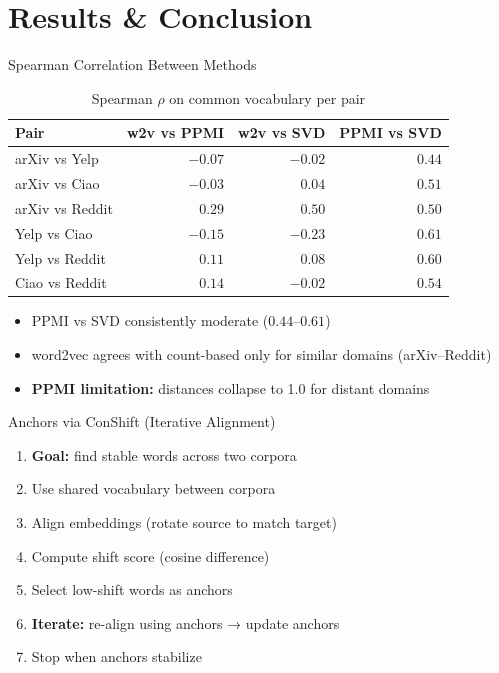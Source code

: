 \documentclass[aspectratio=169]{beamer}
\begin{document}
\section{Results \& Conclusion}

\begin{frame}{Spearman Correlation Between Methods}
    \begin{table}[h]
        \centering
        \begin{tabular}{lrrr}
            \toprule
            Pair & w2v vs PPMI & w2v vs SVD & PPMI vs SVD \\
            \midrule
            arXiv vs Yelp   & \(-0.07\) & \(-0.02\) & \(0.44\) \\
            arXiv vs Ciao   & \(-0.03\) & \(0.04\)  & \(0.51\) \\
            arXiv vs Reddit & \(\mathbf{0.29}\)  & \(\mathbf{0.50}\)  & \(0.50\) \\
            Yelp vs Ciao    & \(-0.15\) & \(-0.23\) & \(\mathbf{0.61}\) \\
            Yelp vs Reddit  & \(0.11\)  & \(0.08\)  & \(0.60\) \\
            Ciao vs Reddit  & \(0.14\)  & \(-0.02\) & \(0.54\) \\
            \bottomrule
        \end{tabular}
        \caption{Spearman \( \rho \) on common vocabulary per pair}
    \end{table}

    \begin{itemize}
        \item PPMI vs SVD consistently moderate (\( 0.44 \)--\( 0.61 \))
        \item word2vec agrees with count-based only for similar domains (arXiv--Reddit)
        \item \textbf{PPMI limitation:} distances collapse to 1.0 for distant domains
    \end{itemize}
\end{frame}

\begin{frame}{Anchors via ConShift (Iterative Alignment)}
  \begin{enumerate}
    \item \textbf{Goal:} find stable words across two corpora
    \item Use shared vocabulary between corpora
    \item Align embeddings (rotate source to match target)
    \item Compute shift score (cosine difference)
    \item Select low-shift words as anchors
    \item \textbf{Iterate:} re-align using anchors → update anchors
    \item Stop when anchors stabilize
  \end{enumerate}
\end{frame}
\end{document}
